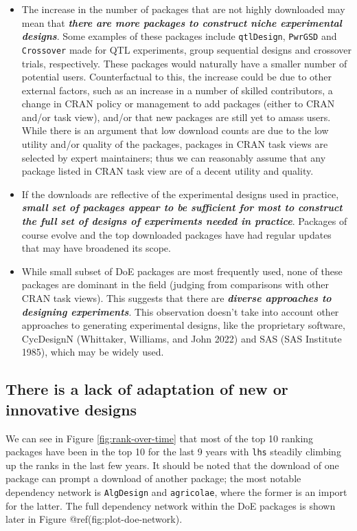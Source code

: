 \documentclass{article}
\providecommand{\tightlist}{%
  \setlength{\itemsep}{0pt}\setlength{\parskip}{0pt}}
\def\tightlist{}
\begin{document}
\begin{itemize}
\tightlist
\item
  The increase in the number of packages that are not highly downloaded
  may mean that \textbf{\emph{there are more packages to construct niche
  experimental designs}}. Some examples of these packages include
  \texttt{qtlDesign}, \texttt{PwrGSD} and \texttt{Crossover} made for
  QTL experiments, group sequential designs and crossover trials,
  respectively. These packages would naturally have a smaller number of
  potential users. Counterfactual to this, the increase could be due to
  other external factors, such as an increase in a number of skilled
  contributors, a change in CRAN policy or management to add packages
  (either to CRAN and/or task view), and/or that new packages are still
  yet to amass users. While there is an argument that low download
  counts are due to the low utility and/or quality of the packages,
  packages in CRAN task views are selected by expert maintainers; thus
  we can reasonably assume that any package listed in CRAN task view are
  of a decent utility and quality.
\item
  If the downloads are reflective of the experimental designs used in
  practice, \textbf{\emph{small set of packages appear to be sufficient
  for most to construct the full set of designs of experiments needed in
  practice}}. Packages of course evolve and the top downloaded packages
  have had regular updates that may have broadened its scope.
\item
  While small subset of DoE packages are most frequently used, none of
  these packages are dominant in the field (judging from comparisons
  with other CRAN task views). This suggests that there are
  \textbf{\emph{diverse approaches to designing experiments}}. This
  observation doesn't take into account other approaches to generating
  experimental designs, like the proprietary software, CycDesignN
  (Whittaker, Williams, and John 2022) and SAS (SAS Institute 1985),
  which may be widely used.
\end{itemize}

\hypertarget{ranking}{%
\subsection{There is a lack of adaptation of new or innovative
designs}\label{ranking}}

We can see in Figure \ref{fig:rank-over-time} that most of the top 10
ranking packages have been in the top 10 for the last 9 years with
\texttt{lhs} steadily climbing up the ranks in the last few years. It
should be noted that the download of one package can prompt a download
of another package; the most notable dependency network is
\texttt{AlgDesign} and \texttt{agricolae}, where the former is an import
for the latter. The full dependency network within the DoE packages is
shown later in Figure @ref(fig:plot-doe-network).
\end{document}
